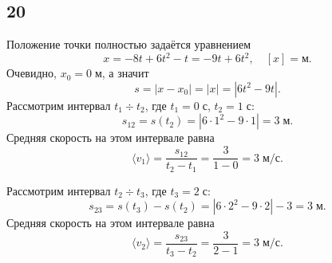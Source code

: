 \subsection{20}

Положение точки полностью задаётся уравнением
\[
x=-8t+6t^2-t=-9t+6t^2,\quad[x]=\text{м}.
\]
Очевидно, $x_0=0\;\text{м}$, а значит
\[
s=|x-x_0|=|x|=\left|6t^2-9t\right|.
\]
Рассмотрим интервал $t_1\div t_2$, где $t_1=0\;\text{с}$, $t_2=1\;\text{с}$:
\[
s_{12}=s(t_2)=\left|6\cdot1^2-9\cdot1\right|=3\;\text{м}.
\]
Средняя скорость на этом интервале равна
\[
\langle v_1\rangle=\frac{s_{12}}{t_2-t_1}=\frac{3}{1-0}=3\;\text{м/с}.
\]

Рассмотрим интервал $t_2\div t_3$, где $t_3=2\;\text{с}$:
\[
s_{23}=s(t_3)-s(t_2)=\left|6\cdot2^2-9\cdot2\right|-3=3\;\text{м}.
\]
Средняя скорость на этом интервале равна
\[
\langle v_2\rangle=\frac{s_{23}}{t_3-t_2}=\frac{3}{2-1}=3\;\text{м/с}.
\]